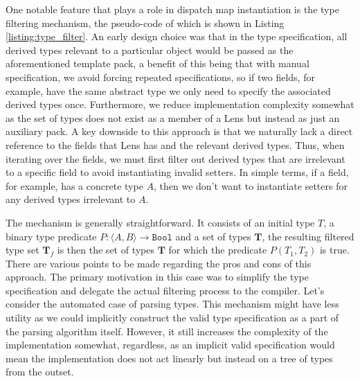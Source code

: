 One notable feature that plays a role in dispatch map instantiation is the type filtering mechanism, the pseudo-code of which is shown in Listing \ref{listing:type_filter}. An early design choice was that in the type specification, all derived types relevant to a particular object would be passed as the aforementioned template pack, a benefit of this being that with manual specification, we avoid forcing repeated specifications, so if two fields, for example, have the same abstract type we only need to specify the associated derived types once. Furthermore, we reduce implementation complexity somewhat as the set of types does not exist as a member of a Lens but instead as just an auxiliary pack. A key downside to this approach is that we naturally lack a direct reference to the fields that Lens has and the relevant derived types. Thus, when iterating over the fields, we must first filter out derived types that are irrelevant to a specific field to avoid instantiating invalid setters. In simple terms, if a field, for example, has a concrete type $A$, then we don't want to instantiate setters for any derived types irrelevant to $A$. 

\begin{listing}[ht!]
  
  \caption{Type filter}
  \label{listing:type_filter}
\end{listing}

The mechanism is generally straightforward. It consists of an initial type $T$, a binary type predicate $P : \langle A, B \rangle \rightarrow \texttt{Bool}$ and a set of types $\mathbf T$, the resulting filtered type set $\mathbf T_f$ is then the set of types $\mathbf T$ for which the predicate $P(T_1, T_2)$ is true. There are various points to be made regarding the pros and cons of this approach. The primary motivation in this case was to simplify the type specification and delegate the actual filtering process to the compiler. Let's consider the automated case of parsing types. This mechanism might have less utility as we could implicitly construct the valid type specification as a part of the parsing algorithm itself. However, it still increases the complexity of the implementation somewhat, regardless, as an implicit valid specification would mean the implementation does not act linearly but instead on a tree of types from the outset. 

\begin{listing}[ht!]
  
  \caption{Pseudocode snippet of the unboxing process}
  \label{listing:unbox_usertype}
\end{listing}


